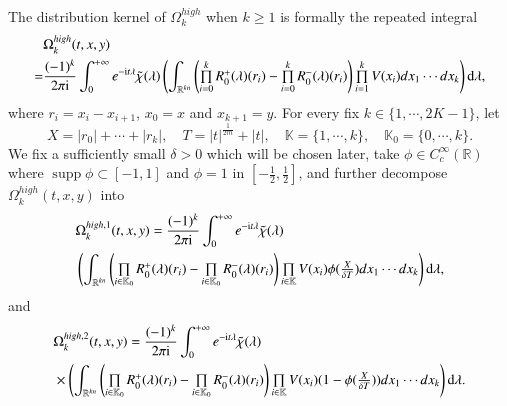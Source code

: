 \documentclass[11pt,reqno]{amsart}
\def\d{{\rm d}}
\def\i{{\rm i}}
\numberwithin{equation}{section}
\theoremstyle{definition}
\begin{document}
The distribution kernel of $\Omega_k^{high}$ when $k\geq1$ is formally the repeated integral
\begin{equation*}
	\begin{split}
		&\Omega_k^{high}(t,x,y)\\
		=&\frac{(-1)^k}{2\pi\i}\int_0^{+\infty}e^{-\mathrm{i}t\lambda}\tilde{\chi}(\lambda)\left(\int_{\mathbb{R}^{kn}}\left(\mbox{$\prod\limits_{i=0}^kR_0^+(\lambda)(r_i)-\prod\limits_{i=0}^kR_0^-(\lambda)(r_i)$}\right)\mbox{$\prod\limits_{i=1}^kV(x_i)$}dx_1\cdots dx_k\right)\d\lambda,
	\end{split}
\end{equation*}
where $r_i=x_i-x_{i+1}$, $x_0=x$ and $x_{k+1}=y$. For every fix $k\in\{1,\cdots,2K-1\}$, let
\begin{equation*}
	X=|r_0|+\cdots+|r_k|,\quad T=|t|^\frac{1}{2m}+|t|,\quad\mathbb{K}=\{1,\cdots,k\},\quad\mathbb{K}_0=\{0,\cdots,k\}.
\end{equation*}
We fix a sufficiently small $\delta>0$ which will be chosen later, take $\phi\in C_c^\infty(\mathbb{R})$ where $\operatorname{supp}\phi\subset[-1,1]$ and $\phi=1$ in $[-\frac12,\frac12]$, and further decompose $\Omega_k^{high}(t,x,y)$ into
\begin{equation}\label{Omegak1origin}
	\begin{split}
		&\Omega_k^{high,1}(t,x,y)
		=\frac{(-1)^k}{2\pi\i}\int_0^{+\infty}e^{-\mathrm{i}t\lambda}\tilde{\chi}(\lambda)\\
		&\left(\int_{\mathbb{R}^{kn}}\left(\mbox{$\prod\limits_{i\in\mathbb{K}_0}R_0^+(\lambda)(r_i)-\prod\limits_{i\in\mathbb{K}_0}R_0^-(\lambda)(r_i)$}\right)\mbox{$\prod\limits_{i\in\mathbb{K}}V(x_i)$}\phi(\mbox{$\frac{X}{\delta T}$})dx_1\cdots dx_k\right)\d\lambda,
	\end{split}
\end{equation}
and
\begin{equation}\label{Omegak2origin}
	\begin{split}
		&\Omega_k^{high,2}(t,x,y)=\frac{(-1)^k}{2\pi\i}\int_0^{+\infty}e^{-\mathrm{i}t\lambda}\tilde{\chi}(\lambda)\\
		&\times\left(\int_{\mathbb{R}^{kn}}\left(\mbox{$\prod\limits_{i\in\mathbb{K}_0}R_0^+(\lambda)(r_i)-\prod\limits_{i\in\mathbb{K}_0}R_0^-(\lambda)(r_i)$}\right)\mbox{$\prod\limits_{i\in\mathbb{K}}V(x_i)$}(1-\phi(\mbox{$\frac{X}{\delta T}$}))dx_1\cdots dx_k\right)\d\lambda.
	\end{split}
\end{equation}
\end{document}
